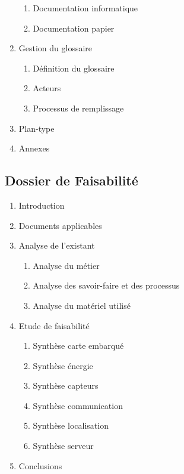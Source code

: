 \begin{enumerate}
\begin{enumerate}
\item Documentation informatique
\item Documentation papier
\end{enumerate}
\item Gestion du glossaire
\begin{enumerate}
\item Définition du glossaire
\item Acteurs
\item Processus de remplissage
\end{enumerate}
\item Plan-type
\item Annexes
\end{enumerate}

\subsection{Dossier de Faisabilité}
\begin{enumerate}
\item Introduction
\item Documents applicables
\item Analyse de l'existant
\begin{enumerate}
\item Analyse du métier
\item Analyse des savoir-faire et des processus
\item Analyse du matériel utilisé
\end{enumerate}
\item Etude de faisabilité
\begin{enumerate}
\item Synthèse carte embarqué
\item Synthèse énergie
\item Synthèse capteurs
\item Synthèse communication
\item Synthèse localisation
\item Synthèse serveur
\end{enumerate}
\item Conclusions
\end{enumerate}

